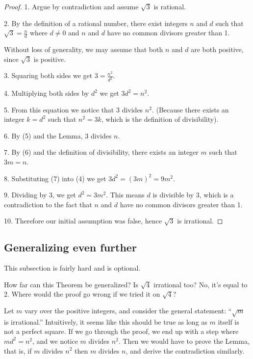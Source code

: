 \documentclass[14pt]{extarticle}
\begin{document}
\begin{proof}
1. Argue by contradiction and assume $\sqrt{3}$ is rational.

2. By the definition of a rational number, there exist integers $n$ and $d$ such that $\sqrt{3} = \frac{n}{d}$ where $d \neq 0$ and $n$ and $d$ have no common divisors greater than 1. 

Without loss of generality, we may assume that both $n$ and $d$ are both positive, since $\sqrt{3}$ is positive.

3. Squaring both sides we get $3 = \frac{n^2}{d^2}$.

4. Multiplying both sides by $d^2$ we get $3d^2 = n^2$.

5. From this equation we notice that $3$ divides $n^2$. (Because there exists an integer $k = d^2$ such that $n^2 = 3k$, which is the definition of divisibility). 

6. By (5) and the Lemma, $3$ divides $n$.

7. By (6) and the definition of divisibility, there exists an integer $m$ such that $3m = n$.

8. Substituting (7) into (4) we get $3d^2 = (3m)^2 = 9m^2$.

9. Dividing by 3, we get $d^2 = 3m^2$. This means $d$ is divisible by 3, which is a contradiction to the fact that $n$ and $d$ have no common divisors greater than 1.

10. Therefore our initial assumption was false, hence $\sqrt{3}$ is irrational.
\end{proof}

\subsection{Generalizing even further}

This subsection is fairly hard and is optional.

How far can this Theorem be generalized? Is $\sqrt{4}$ irrational too? No, it's equal to 2. Where would the proof go wrong if we tried it on $\sqrt{4}$?

Let $m$ vary over the positive integers, and consider the general statement: ``$\sqrt{m}$ is irrational.'' Intuitively, it seems like this should be true as long as $m$ itself is not a perfect square. If we go through the proof, we end up with a step where $md^2 = n^2$, and we notice $m$ divides $n^2$. Then we would have to prove the Lemma, that is, if $m$ divides $n^2$ then $m$ divides $n$, and derive the contradiction similarly.
\end{document}
